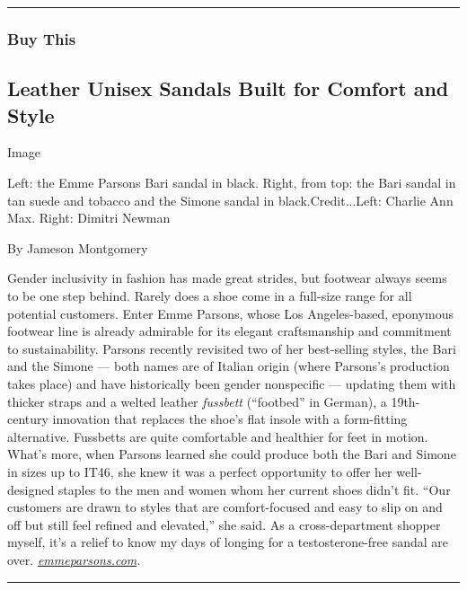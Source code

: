\begin{center}\rule{0.5\linewidth}{\linethickness}\end{center}

\hypertarget{buy-this}{%
\subsubsection{Buy This}\label{buy-this}}

\hypertarget{leather-unisex-sandals-built-for-comfort-and-style}{%
\subsection{Leather Unisex Sandals Built for Comfort and
Style}\label{leather-unisex-sandals-built-for-comfort-and-style}}

Image

Left: the Emme Parsons Bari sandal in black. Right, from top: the Bari
sandal in tan suede and tobacco and the Simone sandal in
black.Credit...Left: Charlie Ann Max. Right: Dimitri Newman

By Jameson Montgomery

Gender inclusivity in fashion has made great strides, but footwear
always seems to be one step behind. Rarely does a shoe come in a
full-size range for all potential customers. Enter Emme Parsons, whose
Los Angeles-based, eponymous footwear line is already admirable for its
elegant craftsmanship and commitment to sustainability. Parsons recently
revisited two of her best-selling styles, the Bari and the Simone ---
both names are of Italian origin (where Parsons's production takes
place) and have historically been gender nonspecific --- updating them
with thicker straps and a welted leather \emph{fussbett} (``footbed'' in
German), a 19th-century innovation that replaces the shoe's flat insole
with a form-fitting alternative. Fussbetts are quite comfortable and
healthier for feet in motion. What's more, when Parsons learned she
could produce both the Bari and Simone in sizes up to IT46, she knew it
was a perfect opportunity to offer her well-designed staples to the men
and women whom her current shoes didn't fit. ``Our customers are drawn
to styles that are comfort-focused and easy to slip on and off but still
feel refined and elevated,'' she said. As a cross-department shopper
myself, it's a relief to know my days of longing for a testosterone-free
sandal are over.
\href{https://www.emmeparsons.com}{\emph{emmeparsons.com}}\emph{.}

\begin{center}\rule{0.5\linewidth}{\linethickness}\end{center}

